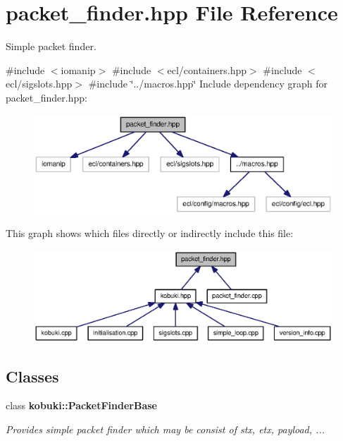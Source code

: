 \section{packet\-\_\-finder.\-hpp \-File \-Reference}
\label{packet__finder_8hpp}


\-Simple packet finder.  


{\ttfamily \#include $<$iomanip$>$}\*
{\ttfamily \#include $<$ecl/containers.\-hpp$>$}\*
{\ttfamily \#include $<$ecl/sigslots.\-hpp$>$}\*
{\ttfamily \#include \char`\"{}../macros.\-hpp\char`\"{}}\*
\-Include dependency graph for packet\-\_\-finder.\-hpp\-:
\nopagebreak
\begin{figure}[H]
\begin{center}
\leavevmode
\includegraphics[width=350pt]{packet__finder_8hpp__incl}
\end{center}
\end{figure}
\-This graph shows which files directly or indirectly include this file\-:
\nopagebreak
\begin{figure}[H]
\begin{center}
\leavevmode
\includegraphics[width=350pt]{packet__finder_8hpp__dep__incl}
\end{center}
\end{figure}
\subsection*{\-Classes}
\begin{DoxyCompactItemize}
\item 
class {\bf kobuki\-::\-Packet\-Finder\-Base}
\begin{DoxyCompactList}\small\item\em \-Provides simple packet finder which may be consist of stx, etx, payload, ... \end{DoxyCompactList}\end{DoxyCompactItemize}
